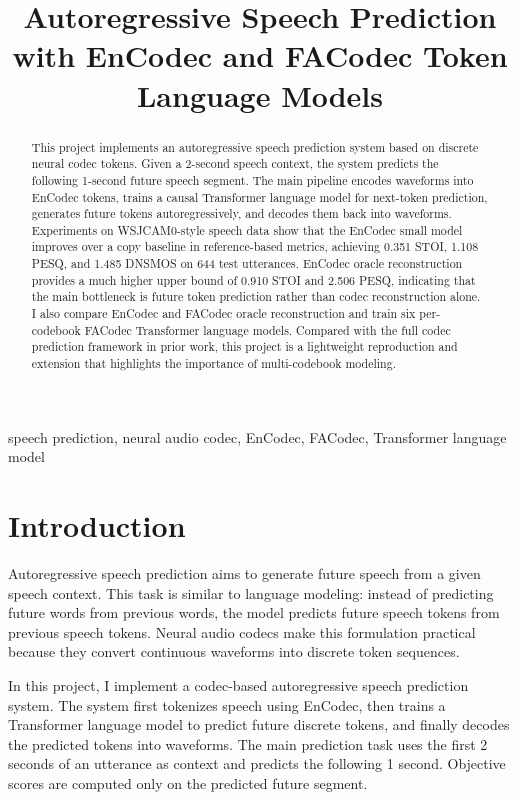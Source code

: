 \documentclass{article}
\title{Autoregressive Speech Prediction with EnCodec and FACodec Token Language Models}
\begin{document}
	\ninept
	
	\maketitle
	
	\begin{abstract}
		This project implements an autoregressive speech prediction system based on discrete neural codec tokens. Given a 2-second speech context, the system predicts the following 1-second future speech segment. The main pipeline encodes waveforms into EnCodec tokens, trains a causal Transformer language model for next-token prediction, generates future tokens autoregressively, and decodes them back into waveforms. Experiments on WSJCAM0-style speech data show that the EnCodec small model improves over a copy baseline in reference-based metrics, achieving 0.351 STOI, 1.108 PESQ, and 1.485 DNSMOS on 644 test utterances. EnCodec oracle reconstruction provides a much higher upper bound of 0.910 STOI and 2.506 PESQ, indicating that the main bottleneck is future token prediction rather than codec reconstruction alone. I also compare EnCodec and FACodec oracle reconstruction and train six per-codebook FACodec Transformer language models. Compared with the full codec prediction framework in prior work, this project is a lightweight reproduction and extension that highlights the importance of multi-codebook modeling.
	\end{abstract}
	
	\begin{keywords}
		speech prediction, neural audio codec, EnCodec, FACodec, Transformer language model
	\end{keywords}
	
	\section{Introduction}
	\label{sec:intro}
	
	Autoregressive speech prediction aims to generate future speech from a given speech context. This task is similar to language modeling: instead of predicting future words from previous words, the model predicts future speech tokens from previous speech tokens. Neural audio codecs make this formulation practical because they convert continuous waveforms into discrete token sequences.
	
	In this project, I implement a codec-based autoregressive speech prediction system. The system first tokenizes speech using EnCodec, then trains a Transformer language model to predict future discrete tokens, and finally decodes the predicted tokens into waveforms. The main prediction task uses the first 2 seconds of an utterance as context and predicts the following 1 second. Objective scores are computed only on the predicted future segment.
	
\end{document}
